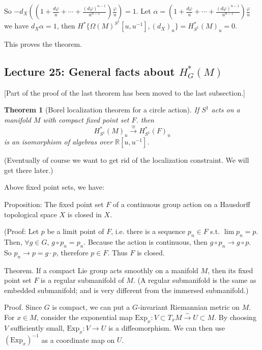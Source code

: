 \documentclass{article}
\theoremstyle{mystyle}
\newtheorem*{theorem*}{Theorem}
\theoremstyle{remark}
\numberwithin{equation}{section}
\begin{document}
So $-d_X\left((1+\frac{d\varphi}{u}+\cdots + \frac{(d\varphi)^{n-1}}{u^{n-1}})\frac{\varphi}{u}\right) = 1$. Let $\alpha  = (1+\frac{d\varphi}{u}+\cdots + \frac{(d\varphi)^{n-1}}{u^{n-1}})\frac{\varphi}{u}$ we have $d_X\alpha=1$, then $H^*\{\Omega(M)^{S^1}[u,u^{-1}],(d_X)_u\}= H^*_{S^1}(M)_u=0$. 

This proves the theorem.





\subsection{Lecture 25: General facts about $H^*_G(M)$}

[Part of the proof of the last theorem has been moved to the last subsection.]


\begin{theorem*}[Borel localization theorem for a circle action]
If $S^1$ acts on a manifold $M$ with compact fixed point set $F$. then
$$H^*_{S^1}(M)_u\xrightarrow{\cong} H^*_{S^1}(F)_u$$
is an isomorphism of algebras over $\mathbb{R}[u,u^{-1}]$. 
\end{theorem*}

(Eventually of course we want to get rid of the localization constraint. We will get there later.)



Above fixed point sets, we have:

Proposition: The fixed point set $F$ of a continuous group action on a Hausdorff topological space $X$ is closed in $X$.

(Proof: Let $p$ be a limit point of $F$, i.e. there is a sequence $p_n\in F$ s.t. $\lim p_n = p$. Then, $\forall g \in G$, $g\circ p_n = p_n$. Because the action is continuous, then $g\circ p_n\rightarrow  g\circ p$. So $p_n\rightarrow p=g\cdot p$, therefore $p\in F$. Thus $F$ is closed.

Theorem. If a compact Lie group acts smoothly on a manifold $M$, then its fixed point set $F$ is a regular submanifold of $M$. (A regular submanifold is the same as embedded submanifold; and is very different from the immersed submanifold.)

Proof. Since $G$ is compact, we can put a $G$-invariant Riemannian metric on $M$. For $x\in M$, consider the exponential map 
$\mathrm{Exp}_x\colon V\subset T_xM \xrightarrow{\sim} U\subset M$. By choosing 
$V$ sufficiently small, $\mathrm{Exp}_x\colon V\rightarrow U$ is a diffeomorphism. We can then use $(\mathrm{Exp}_x)^{-1}$ as a coordinate map on $U$. 
\end{document}
